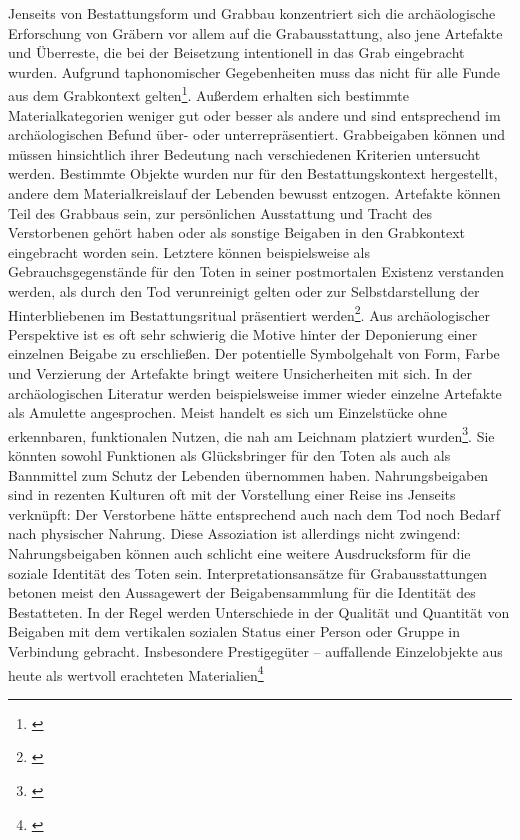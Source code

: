 \documentclass[openany,twoside,twocolumn]{book}
\let\rmarkdownfootnote\footnote%
\def\footnote{\protect\rmarkdownfootnote}
\begin{document}
Jenseits von Bestattungsform und Grabbau konzentriert sich die
archäologische Erforschung von Gräbern vor allem auf die
Grabausstattung, also jene Artefakte und Überreste, die bei der
Beisetzung intentionell in das Grab eingebracht wurden. Aufgrund
taphonomischer Gegebenheiten muss das nicht für alle Funde aus dem
Grabkontext gelten\footnote{\textcite{ravn_use_2000}}. Außerdem erhalten
sich bestimmte Materialkategorien weniger gut oder besser als andere und
sind entsprechend im archäologischen Befund über- oder
unterrepräsentiert. Grabbeigaben können und müssen hinsichtlich ihrer
Bedeutung nach verschiedenen Kriterien untersucht werden. Bestimmte
Objekte wurden nur für den Bestattungskontext hergestellt, andere dem
Materialkreislauf der Lebenden bewusst entzogen. Artefakte können Teil
des Grabbaus sein, zur persönlichen Ausstattung und Tracht des
Verstorbenen gehört haben oder als sonstige Beigaben in den Grabkontext
eingebracht worden sein. Letztere können beispielsweise als
Gebrauchsgegenstände für den Toten in seiner postmortalen Existenz
verstanden werden, als durch den Tod verunreinigt gelten oder zur
Selbstdarstellung der Hinterbliebenen im Bestattungsritual präsentiert
werden\footnote{\textcite{harke_beigabensitte_2003}}. Aus
archäologischer Perspektive ist es oft sehr schwierig die Motive hinter
der Deponierung einer einzelnen Beigabe zu erschließen. Der potentielle
Symbolgehalt von Form, Farbe und Verzierung der Artefakte bringt weitere
Unsicherheiten mit sich. In der archäologischen Literatur werden
beispielsweise immer wieder einzelne Artefakte als Amulette
angesprochen. Meist handelt es sich um Einzelstücke ohne erkennbaren,
funktionalen Nutzen, die nah am Leichnam platziert wurden\footnote{\textcite{thrane_stichwort_1973}}.
Sie könnten sowohl Funktionen als Glücksbringer für den Toten als auch
als Bannmittel zum Schutz der Lebenden übernommen haben.
Nahrungsbeigaben sind in rezenten Kulturen oft mit der Vorstellung einer
Reise ins Jenseits verknüpft: Der Verstorbene hätte entsprechend auch
nach dem Tod noch Bedarf nach physischer Nahrung. Diese Assoziation ist
allerdings nicht zwingend: Nahrungsbeigaben können auch schlicht eine
weitere Ausdrucksform für die soziale Identität des Toten sein.
Interpretationsansätze für Grabausstattungen betonen meist den
Aussagewert der Beigabensammlung für die Identität des Bestatteten. In
der Regel werden Unterschiede in der Qualität und Quantität von Beigaben
mit dem vertikalen sozialen Status einer Person oder Gruppe in
Verbindung gebracht. Insbesondere Prestigegüter -- auffallende
Einzelobjekte aus heute als wertvoll erachteten Materialien\footnote{\textcite{bernbeck_prestige_1996}}
\end{document}
